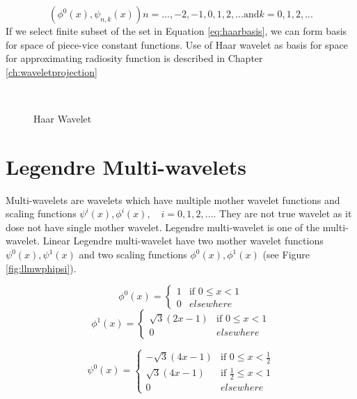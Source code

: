 \begin{equation}\label{eq:haarbasis}
(\phi^0(x),\psi_{n,k}(x)) n=..., -2, -1, 0, 1, 2,... \text{and} k=0,1,2,...
\end{equation}
If we select finite subset of the set in Equation \ref{eq:haarbasis}, we can form basis for space of piece-vice constant functions. Use of Haar wavelet as basis for space for approximating radiosity function is described in Chapter \ref{ch:waveletprojection} 



\begin{figure*}
\centering
{}
\\
\caption{Haar Wavelet}
\label{fig:haarphipsi}
\end{figure*}


 

 \section{Legendre Multi-wavelets}
Multi-wavelets are wavelets which have multiple mother wavelet  functions and scaling functions $\psi^i(x), \phi^i(x),\quad i=0,1,2,...$. They are not true wavelet as it dose not have single mother wavelet. Legendre multi-wavelet is one of the multi-wavelet. Linear Legendre multi-wavelet have two mother wavelet functions $\psi^0(x), \psi^1(x)$ and two scaling functions $\phi^0(x), \phi^1(x)$ (see Figure \ref{fig:llmwphipsi}). 

\begin{equation}
\phi^0(x)=
\left\{
    \begin{array}{ll}
        1  & \mbox{if } 0 \leq x < 1 \\
        0 & elsewhere
    \end{array}
\right.
\end{equation}
\begin{equation}
\phi^1(x)=
\left\{
    \begin{array}{ll}
        \sqrt{3}(2x-1)  & \mbox{if } 0 \leq x < 1 \\
        0 & elsewhere
    \end{array}
\right.
\end{equation}

\begin{equation}
\psi^0(x)=
\left\{
    \begin{array}{ll}
        -\sqrt{3}(4x-1)  & \mbox{if } 0 \leq x < \frac{1}{2} \\
        \sqrt{3}(4x-1)  & \mbox{if } \frac{1}{2} \leq x < 1 \\
        0 & elsewhere
    \end{array}
\right.
\end{equation}


